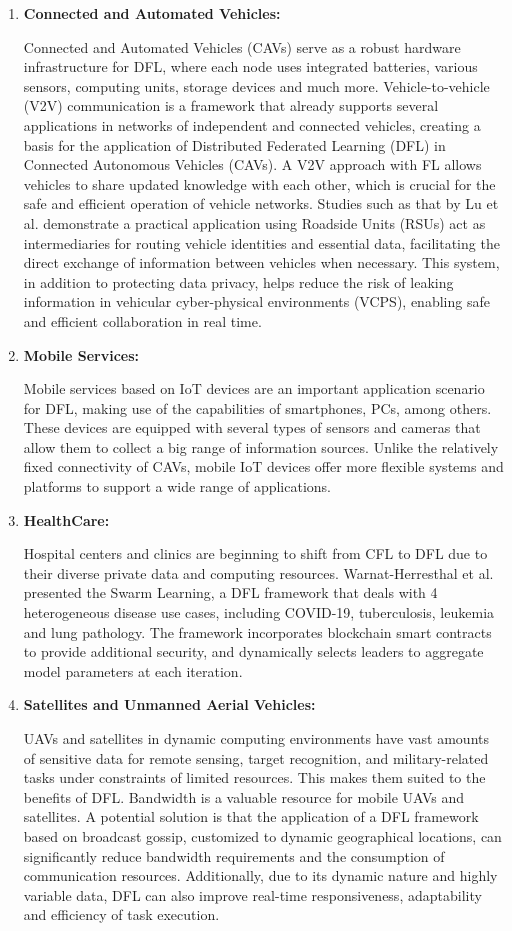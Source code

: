 \begin{enumerate}
	\item \textbf{Connected and Automated Vehicles:}
	
	Connected and Automated Vehicles (CAVs) serve as a robust hardware infrastructure for DFL, where each node uses integrated batteries, various sensors, computing units, storage devices and much more. Vehicle-to-vehicle (V2V) communication is a framework that already supports several applications in networks of independent and connected vehicles, creating a basis for the application of Distributed Federated Learning (DFL) in Connected Autonomous Vehicles (CAVs). A V2V approach with FL allows vehicles to share updated knowledge with each other, which is crucial for the safe and efficient operation of vehicle networks. Studies such as that by Lu et al. demonstrate a practical application using Roadside Units (RSUs) act as intermediaries for routing vehicle identities and essential data, facilitating the direct exchange of information between vehicles when necessary. This system, in addition to protecting data privacy, helps reduce the risk of leaking information in vehicular cyber-physical environments (VCPS), enabling safe and efficient collaboration in real time.
	\item \textbf{Mobile Services:}
	
	Mobile services based on IoT devices are an important application scenario for DFL, making use of the capabilities of smartphones, PCs, among others. These devices are equipped with several types of sensors and cameras that allow them to collect a big range of information sources. Unlike the relatively fixed connectivity of CAVs, mobile IoT devices offer more flexible systems and platforms to support a wide range of applications.
	\item \textbf{HealthCare:}
	
	Hospital centers and clinics are beginning to shift from CFL to DFL due to their diverse private data and computing resources. Warnat-Herresthal et al. presented the Swarm Learning, a DFL framework that deals with 4 heterogeneous disease use cases, including COVID-19, tuberculosis, leukemia and lung pathology. The framework incorporates blockchain smart contracts to provide additional security, and dynamically selects leaders to aggregate model parameters at each iteration.
	\item \textbf{Satellites and Unmanned Aerial Vehicles:}
	
	UAVs and satellites in dynamic computing environments have vast amounts of sensitive data for remote sensing, target recognition, and military-related tasks under constraints of limited resources. This makes them suited to the benefits of DFL. Bandwidth is a valuable resource for mobile UAVs and satellites. A potential solution is that the application of a DFL framework based on broadcast gossip, customized to dynamic geographical locations, can significantly reduce bandwidth requirements and the consumption of communication resources. Additionally, due to its dynamic nature and highly variable data, DFL can also improve real-time responsiveness, adaptability and efficiency of task execution.

\end{enumerate}


